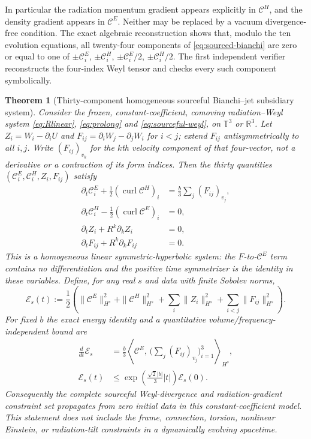 \documentclass[11pt,a4paper]{article}
\newtheorem{theorem}{Theorem}
\begin{document}
In particular the radiation momentum
gradient appears explicitly in
$\mathcal C^H$, and the density
gradient appears in $\mathcal C^E$.
Neither may be replaced by
a vacuum divergence-free condition.
The exact algebraic reconstruction
shows that, modulo the ten
evolution equations,
all twenty-four components of
\eqref{eq:sourced-bianchi}
are zero or equal to one of
$\pm\mathcal C^E_i$,
$\pm\mathcal C^H_i$,
$\pm\mathcal C^E_i/2$,
$\pm\mathcal C^H_i/2$.
The first independent verifier
reconstructs the four-index
Weyl tensor and checks every
such component symbolically.

\begin{theorem}[Thirty-component
homogeneous sourceful Bianchi--jet
subsidiary system]
\label{thm:30}
Consider the frozen, constant-coefficient,
comoving radiation--Weyl system
\eqref{eq:Rlinear},
\eqref{eq:prolong} and
\eqref{eq:sourceful-weyl},
on $\mathbb T^3$ or $\mathbb R^3$.
Let $Z_i=W_i-\partial_iU$ and
$F_{ij}=\partial_iW_j-\partial_jW_i$
for $i<j$; extend $F_{ij}$
antisymmetrically to all $i,j$.
Write $(F_{ij})_{v_k}$ for the
$k$th \emph{velocity component}
of that four-vector, not a derivative
or a contraction of its form indices.
Then the thirty quantities
$(\mathcal C^E_i,\mathcal C^H_i,Z_i,F_{ij})$
satisfy
\begin{equation}\label{eq:30-subsidiary}
\boxed{\quad
\begin{aligned}
\partial_t\mathcal C^E_i
+\tfrac12(\operatorname{curl}\mathcal C^H)_i
&=\frac b3\sum_j (F_{ij})_{v_j},\\
\partial_t\mathcal C^H_i
-\tfrac12(\operatorname{curl}\mathcal C^E)_i
&=0,\\
\partial_t Z_i+R^k\partial_k Z_i&=0,\\
\partial_t F_{ij}+R^k\partial_k F_{ij}&=0.
\end{aligned}
\quad}
\end{equation}
This is a \emph{homogeneous linear
symmetric-hyperbolic} system: the
$F$-to-$\mathcal C^E$ term
contains no differentiation and
the positive time symmetrizer
is the identity in these
variables. Define, for any
real $s$ and data with finite
Sobolev norms,
\[
\mathcal E_s(t):=\frac12\left(
\|\mathcal C^E\|_{H^s}^2+
\|\mathcal C^H\|_{H^s}^2+
\sum_i\|Z_i\|_{H^s}^2+
\sum_{i<j}\|F_{ij}\|_{H^s}^2
\right).
\]
For fixed $b$ the exact energy
identity and a quantitative
volume/frequency-independent
bound are
\begin{equation}\label{eq:30-energy}
\begin{aligned}
\frac{d}{dt}\mathcal E_s
&=\frac b3\left\langle
\mathcal C^E,\,
\bigl(\sum_j(F_{ij})_{v_j}\bigr)_{i=1}^3
\right\rangle_{H^s},\\
\mathcal E_s(t)
&\le \exp\!\left(
\frac{\sqrt2|b|}{3}|t|
\right)\mathcal E_s(0).
\end{aligned}
\end{equation}
Consequently the complete
sourceful Weyl-divergence and
radiation-gradient constraint
set propagates from zero initial
data in this constant-coefficient
model. This statement does
\emph{not} include the frame,
connection, torsion, nonlinear
Einstein, or radiation-tilt
constraints in a dynamically
evolving spacetime.
\end{theorem}
\end{document}
